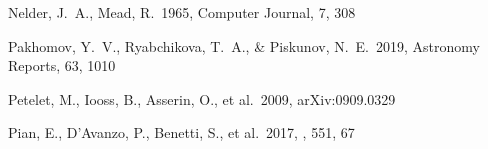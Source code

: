 \documentclass[twocolumn, twocolappendix]{aastex63}
\begin{document}
\begin{thebibliography}{}




 Nelder, J.~A., Mead, R.\ 1965, Computer Journal, 7, 308





 Pakhomov, Y.~V., Ryabchikova, T.~A., \& Piskunov, N.~E.\ 2019, Astronomy Reports, 63, 1010








 Petelet, M., Iooss, B., Asserin, O., et al.\ 2009, arXiv:0909.0329


 Pian, E., D'Avanzo, P., Benetti, S., et al.\ 2017, \nat, 551, 67












\end{thebibliography}
\end{document}
